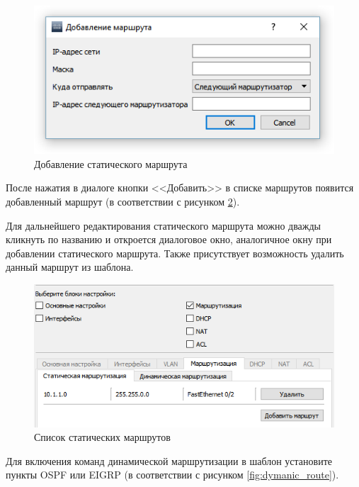 \begin{enumerate}
\begin{enumerate}
\begin{figure}[th!]
	\centering
	\includegraphics[width=\linewidth]{pic/add_route}
	\caption{Добавление статического маршрута}
	\label{fig:add_route}
\end{figure}

После нажатия в диалоге кнопки <<Добавить>> в списке маршрутов появится добавленный маршрут (в соответствии с рисунком \ref{fig:add_route_2}).

Для дальнейшего редактирования статического маршрута можно дважды кликнуть по названию и откроется диалоговое окно, аналогичное окну при добавлении статического маршрута. Также присутствует возможность удалить данный маршрут из шаблона.


\begin{figure}[th!]
	\centering
	\includegraphics[width=1\linewidth]{pic/add_route_2}
	\caption{Список статических маршрутов}
	\label{fig:add_route_2}
\end{figure}

Для включения команд динамической маршрутизации в шаблон установите пункты OSPF или EIGRP (в соответствии с рисунком \ref{fig:dymanic_route}).


\end{enumerate}
\end{enumerate}
